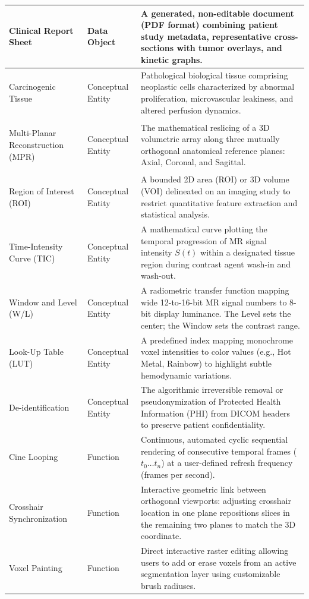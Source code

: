 \documentclass[11pt, a4paper]{article}
\begin{document}
\begin{tabularx}{\textwidth}{|>{\bfseries\raggedright\arraybackslash}p{3.6cm}|>{\raggedright\arraybackslash}p{2.9cm}|X|}
    \hline
    Clinical Report Sheet & Data Object & A generated, non-editable document (PDF format) combining patient study metadata, representative cross-sections with tumor overlays, and kinetic graphs. \\
    \hline
    Carcinogenic Tissue & Conceptual Entity & Pathological biological tissue comprising neoplastic cells characterized by abnormal proliferation, microvascular leakiness, and altered perfusion dynamics. \\
    \hline
    Multi-Planar Reconstruction (MPR) & Conceptual Entity & The mathematical reslicing of a 3D volumetric array along three mutually orthogonal anatomical reference planes: Axial, Coronal, and Sagittal. \\
    \hline
    Region of Interest (ROI) & Conceptual Entity & A bounded 2D area (ROI) or 3D volume (VOI) delineated on an imaging study to restrict quantitative feature extraction and statistical analysis. \\
    \hline
    Time-Intensity Curve (TIC) & Conceptual Entity & A mathematical curve plotting the temporal progression of MR signal intensity $S(t)$ within a designated tissue region during contrast agent wash-in and wash-out. \\
    \hline
    Window and Level (W/L) & Conceptual Entity & A radiometric transfer function mapping wide 12-to-16-bit MR signal numbers to 8-bit display luminance. The Level sets the center; the Window sets the contrast range. \\
    \hline
    Look-Up Table (LUT) & Conceptual Entity & A predefined index mapping monochrome voxel intensities to color values (e.g., Hot Metal, Rainbow) to highlight subtle hemodynamic variations. \\
    \hline
    De-identification & Conceptual Entity & The algorithmic irreversible removal or pseudonymization of Protected Health Information (PHI) from DICOM headers to preserve patient confidentiality. \\
    \hline
    Cine Looping & Function & Continuous, automated cyclic sequential rendering of consecutive temporal frames ($t_0 \dots t_n$) at a user-defined refresh frequency (frames per second). \\
    \hline
    Crosshair Synchronization & Function & Interactive geometric link between orthogonal viewports: adjusting crosshair location in one plane repositions slices in the remaining two planes to match the 3D coordinate. \\
    \hline
    Voxel Painting & Function & Direct interactive raster editing allowing users to add or erase voxels from an active segmentation layer using customizable brush radiuses. \\

\end{tabularx}
\end{document}
